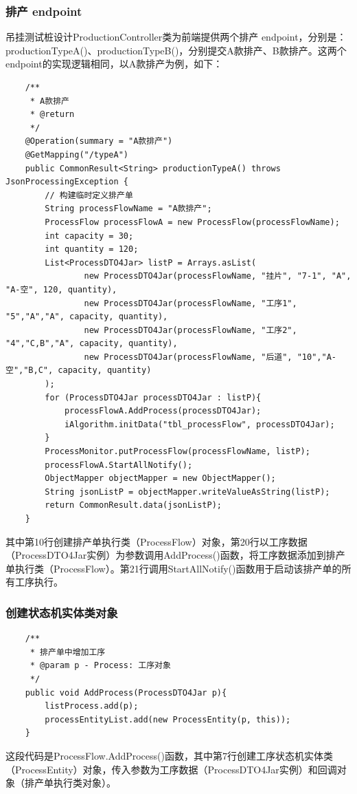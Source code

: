 \subsubsection{排产 endpoint}
吊挂测试桩设计ProductionController类为前端提供两个排产 endpoint，分别是：productionTypeA()、productionTypeB()，分别提交A款排产、B款排产。这两个endpoint的实现逻辑相同，以A款排产为例，如下：
\begin{lstlisting}
    /**
     * A款排产
     * @return
     */
    @Operation(summary = "A款排产")
    @GetMapping("/typeA")
    public CommonResult<String> productionTypeA() throws JsonProcessingException {
        // 构建临时定义排产单
        String processFlowName = "A款排产";
        ProcessFlow processFlowA = new ProcessFlow(processFlowName);
        int capacity = 30;
        int quantity = 120;
        List<ProcessDTO4Jar> listP = Arrays.asList(
                new ProcessDTO4Jar(processFlowName, "挂片", "7-1", "A", "A-空", 120, quantity),
                new ProcessDTO4Jar(processFlowName, "工序1", "5","A","A", capacity, quantity),
                new ProcessDTO4Jar(processFlowName, "工序2", "4","C,B","A", capacity, quantity),
                new ProcessDTO4Jar(processFlowName, "后道", "10","A-空","B,C", capacity, quantity)
        );
        for (ProcessDTO4Jar processDTO4Jar : listP){
            processFlowA.AddProcess(processDTO4Jar);
            iAlgorithm.initData("tbl_processFlow", processDTO4Jar);
        }
        ProcessMonitor.putProcessFlow(processFlowName, listP);
        processFlowA.StartAllNotify();
        ObjectMapper objectMapper = new ObjectMapper();
        String jsonListP = objectMapper.writeValueAsString(listP);
        return CommonResult.data(jsonListP);
    }
\end{lstlisting}\vspace{-30pt}
其中第10行创建排产单执行类（ProcessFlow）对象，第20行以工序数据（ProcessDTO4Jar实例）为参数调用AddProcess()函数，将工序数据添加到排产单执行类（ProcessFlow）。第21行调用StartAllNotify()函数用于启动该排产单的所有工序执行。

\subsubsection{创建状态机实体类对象}
\begin{lstlisting}
    /**
     * 排产单中增加工序
     * @param p - Process: 工序对象
     */
    public void AddProcess(ProcessDTO4Jar p){
        listProcess.add(p);
        processEntityList.add(new ProcessEntity(p, this));
    }
\end{lstlisting}\vspace{-30pt}
这段代码是ProcessFlow.AddProcess()函数，其中第7行创建工序状态机实体类（ProcessEntity）对象，传入参数为工序数据（ProcessDTO4Jar实例）和回调对象（排产单执行类对象）。


